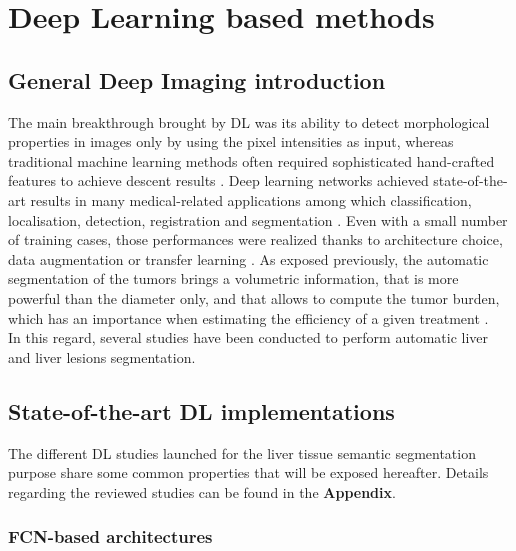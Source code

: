 \documentclass[]{article}
\begin{document}
	
	\section*{Deep Learning based methods}
	
	\subsection*{General Deep Imaging introduction}
	
	The main breakthrough brought by DL was its ability to detect
	morphological properties in images only by using the pixel intensities
	as input, whereas traditional machine learning methods often required
	sophisticated hand-crafted features to achieve descent results \cite{Litjens2017, Suzuki2017}. Deep learning networks achieved
	state-of-the-art results in many medical-related applications among
	which classification, localisation, detection, registration and
	segmentation \cite{Ker2017}. Even with a small number of
	training cases, those performances were realized thanks to architecture
	choice, data augmentation or transfer learning \cite{Zheng2018, Hu2018}.
	As exposed previously, the automatic segmentation of the tumors brings a
	volumetric information, that is more powerful than the diameter only,
	and that allows to compute the tumor burden, which has an importance
	when estimating the efficiency of a given treatment \cite{Gobbi2004, Bornemann2007, Heussel2007, Kuhnigk2006, Puesken2010, Bauknecht2010}.\\
	In this regard, several studies have been conducted to perform automatic
	liver and liver lesions segmentation.
	
	
	\subsection*{State-of-the-art DL implementations}
	
	The different DL studies launched for the liver tissue semantic
	segmentation purpose share some common properties that will be exposed
	hereafter. Details regarding the reviewed studies can be found in the
	\textbf{Appendix}.
	
	\subsubsection*{FCN-based architectures}
	
\end{document}
